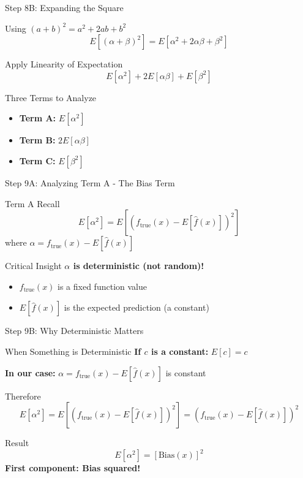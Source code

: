 \documentclass[10pt]{beamer}
\begin{document}
\begin{frame}{Step 8B: Expanding the Square}
\begin{examplebox}{Using $(a + b)^2 = a^2 + 2ab + b^2$}
$$E[(\alpha + \beta)^2] = E[\alpha^2 + 2\alpha\beta + \beta^2]$$
\end{examplebox}

\begin{keypointsbox}{Apply Linearity of Expectation}
$$E[\alpha^2] + 2E[\alpha\beta] + E[\beta^2]$$
\end{keypointsbox}

\begin{definitionbox}{Three Terms to Analyze}
\begin{itemize}
\item \textbf{Term A:} $E[\alpha^2]$ 
\item \textbf{Term B:} $2E[\alpha\beta]$ 
\item \textbf{Term C:} $E[\beta^2]$ 
\end{itemize}
\end{definitionbox}
\end{frame}

\begin{frame}{Step 9A: Analyzing Term A - The Bias Term}
\begin{definitionbox}{Term A Recall}
$$E[\alpha^2] = E[(f_{\text{true}}(x) - E[\hat{f}(x)])^2]$$
where $\alpha = f_{\text{true}}(x) - E[\hat{f}(x)]$
\end{definitionbox}

\begin{keypointsbox}{Critical Insight}
\textbf{$\alpha$ is deterministic (not random)!}
\begin{itemize}
\item $f_{\text{true}}(x)$ is a fixed function value
\item $E[\hat{f}(x)]$ is the expected prediction (a constant)
\end{itemize}
\end{keypointsbox}
\end{frame}

\begin{frame}{Step 9B: Why Deterministic Matters}
\begin{examplebox}{When Something is Deterministic}
\textbf{If $c$ is a constant:} $E[c] = c$

\textbf{In our case:} $\alpha = f_{\text{true}}(x) - E[\hat{f}(x)]$ is constant
\end{examplebox}

\begin{keypointsbox}{Therefore}
$$E[\alpha^2] = E[(f_{\text{true}}(x) - E[\hat{f}(x)])^2] = (f_{\text{true}}(x) - E[\hat{f}(x)])^2$$
\end{keypointsbox}

\begin{alertbox}{Result}
$$\boxed{E[\alpha^2] = [\text{Bias}(x)]^2}$$
\textbf{First component: Bias squared!}
\end{alertbox}
\end{frame}
\end{document}
